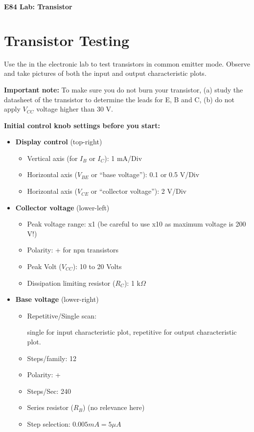 \usepackage{html}


{\Large \bf E84 Lab: Transistor}



\section{Transistor Testing}

Use the 
in the electronic lab to test 
transistors in common emitter mode. 
Observe and take pictures of both the input and output characteristic plots. 


{\bf Important note:} To make sure you do not burn your transistor, 
(a) study the datasheet of the transistor to determine the leads for E, B and C,
(b) do not apply $V_{CC}$ voltage higher than 30 V.


{\bf Initial control knob settings before you start:}
\begin{itemize}
\item {\bf Display control} (top-right)
  \begin{itemize}
  \item Vertical axis (for $I_B$ or $I_C$): 1 mA/Div
  \item Horizontal axis ($V_{BE}$ or ``base voltage''): 0.1 or 0.5 V/Div
  \item Horizontal axis ($V_{CE}$ or ``collector voltage''): 2 V/Div
  \end{itemize}
\item {\bf Collector voltage} (lower-left)
  \begin{itemize}
  \item Peak voltage range: x1 (be careful to use x10 as maximum voltage is 200 V!)
  \item Polarity: + for npn transistors
  \item Peak Volt ($V_{CC}$): 10 to 20 Volts
  \item Dissipation limiting resistor ($R_C$): 1 k$\Omega$
  \end{itemize}
\item {\bf Base voltage} (lower-right)
  \begin{itemize}
  \item Repetitive/Single scan: 

    single for input characteristic plot, repetitive for output characteristic plot.
  \item Steps/family: 12
  \item Polarity: +
  \item Steps/Sec: 240
  \item Series resistor ($R_B$) (no relevance here)
  \item Step selection: $0.005 mA = 5 \mu A$
  \end{itemize}
\end{itemize}

